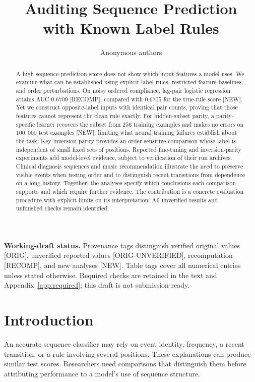 \documentclass[10pt]{article}
\title{Auditing Sequence Prediction\\with Known Label Rules}
\author{Anonymous authors}
\newcommand{\prov}[1]{{\color{black!65}\scriptsize[#1]}}
\newcommand{\orig}{\prov{ORIG}}
\newcommand{\ou}{\prov{ORIG-UNVERIFIED}}
\newcommand{\recomp}{\prov{RECOMP}}
\newcommand{\newres}{\prov{NEW}}
\begin{document}
\raggedbottom
\maketitle

\begin{abstract}
A high sequence-prediction score does not show which input features a model uses. We examine what can be established using explicit label rules, restricted feature baselines, and order perturbations. On noisy ordered compliance, lag-pair logistic regression attains AUC $0.6709$ \recomp, compared with $0.6705$ for the true-rule score \newres. Yet we construct opposite-label inputs with identical pair counts, proving that those features cannot represent the clean rule exactly. For hidden-subset parity, a parity-specific learner recovers the subset from $256$ training examples and makes no errors on $100{,}000$ test examples \newres, limiting what neural training failures establish about the task. Key-inversion parity provides an order-sensitive comparison whose label is independent of small fixed sets of positions. Reported fine-tuning and inversion-parity experiments add model-level evidence, subject to verification of their run archives. Clinical diagnosis sequences and music recommendation illustrate the need to preserve visible events when testing order and to distinguish recent transitions from dependence on a long history. Together, the analyses specify which conclusions each comparison supports and which require further evidence. The contribution is a concrete evaluation procedure with explicit limits on its interpretation. All unverified results and unfinished checks remain identified.
\end{abstract}

{\small\textbf{Working-draft status.} Provenance tags distinguish verified original values \orig, unverified reported values \ou, recomputation \recomp, and new analyses \newres. Table tags cover all numerical entries unless stated otherwise. Required checks are retained in the text and Appendix~\ref{app:required}; this draft is not submission-ready.}

\section{Introduction}
\label{sec:intro}
An accurate sequence classifier may rely on event identity, frequency, a recent transition, or a rule involving several positions. These explanations can produce similar test scores. Researchers need comparisons that distinguish them before attributing performance to a model's use of sequence structure.
\end{document}
